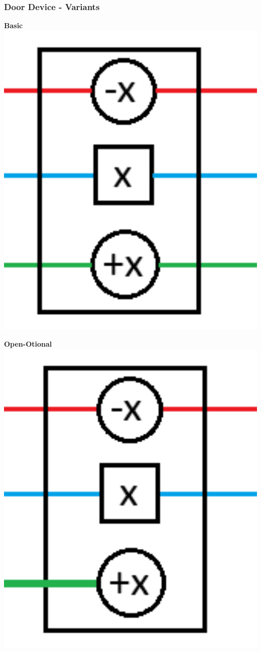 \documentclass{beamer}
\begin{document}
\begin{frame}
  \frametitle{Door Device - Variants}
  \begin{minipage}[b]{0.32\textwidth}
    \textbf{Basic}
    \includegraphics[width=1\textwidth]{res/doors/DoorNormal.png}
  \end{minipage}
  \begin{minipage}[b]{0.32\textwidth}
    \textbf{Open-Otional}
    \includegraphics[width=1\textwidth]{res/doors/DoorOpenOptional.png}

\end{minipage}
\end{frame}
\end{document}
